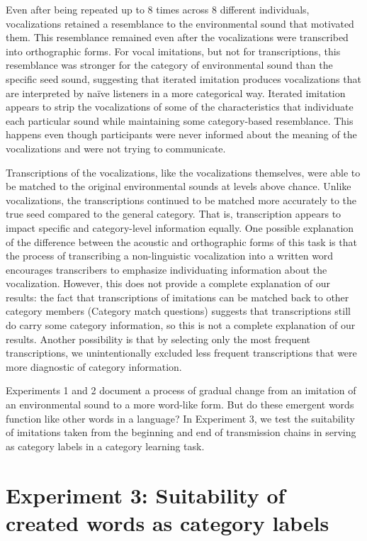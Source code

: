 \documentclass[english,floatsintext,man]{apa6}
\theoremstyle{definition}
\theoremstyle{definition}
\theoremstyle{definition}
\theoremstyle{remark}
\begin{document}
Even after being repeated up to 8 times across 8 different individuals,
vocalizations retained a resemblance to the environmental sound that
motivated them. This resemblance remained even after the vocalizations
were transcribed into orthographic forms. For vocal imitations, but not
for transcriptions, this resemblance was stronger for the category of
environmental sound than the specific seed sound, suggesting that
iterated imitation produces vocalizations that are interpreted by naïve
listeners in a more categorical way. Iterated imitation appears to strip
the vocalizations of some of the characteristics that individuate each
particular sound while maintaining some category-based resemblance. This
happens even though participants were never informed about the meaning
of the vocalizations and were not trying to communicate.

Transcriptions of the vocalizations, like the vocalizations themselves,
were able to be matched to the original environmental sounds at levels
above chance. Unlike vocalizations, the transcriptions continued to be
matched more accurately to the true seed compared to the general
category. That is, transcription appears to impact specific and
category-level information equally. One possible explanation of the
difference between the acoustic and orthographic forms of this task is
that the process of transcribing a non-linguistic vocalization into a
written word encourages transcribers to emphasize individuating
information about the vocalization. However, this does not provide a
complete explanation of our results: the fact that transcriptions of
imitations can be matched back to other category members (Category match
questions) suggests that transcriptions still do carry some category
information, so this is not a complete explanation of our results.
Another possibility is that by selecting only the most frequent
transcriptions, we unintentionally excluded less frequent transcriptions
that were more diagnostic of category information.

Experiments 1 and 2 document a process of gradual change from an
imitation of an environmental sound to a more word-like form. But do
these emergent words function like other words in a language? In
Experiment 3, we test the suitability of imitations taken from the
beginning and end of transmission chains in serving as category labels
in a category learning task.

\hypertarget{experiment-3-suitability-of-created-words-as-category-labels}{%
\section{Experiment 3: Suitability of created words as category
labels}\label{experiment-3-suitability-of-created-words-as-category-labels}}
\end{document}
